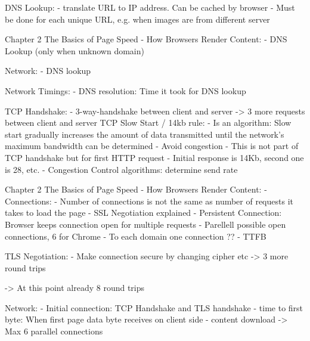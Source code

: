 
DNS Lookup:
- translate URL to IP address. Can be cached by browser
- Must be done for each unique URL, e.g. when images are from different server


Chapter 2 The Basics of Page Speed - How Browsers Render Content:
- DNS Lookup (only when unknown domain)

Network:
- DNS lookup


Network Timings:
- DNS resolution: Time it took for DNS lookup






TCP Handshake:
- 3-way-handshake between client and server
-> 3 more requests between client and server
TCP Slow Start / 14kb rule:
- Is an algorithm: Slow start gradually increases the amount of data transmitted until the network's maximum bandwidth can be determined
- Avoid congestion
- This is not part of TCP handshake but for first HTTP request
- Initial response is 14Kb, second one is 28, etc.
- Congestion Control algorithms: determine send rate

Chapter 2 The Basics of Page Speed - How Browsers Render Content:
- Connections:
- Number of connections is not the same as number of requests it takes to load the page
- SSL Negotiation explained
- Persistent Connection: Browser keeps connection open for multiple requests
- Parellell possible open connections, 6 for Chrome
- To each domain one connection ??
- TTFB





TLS Negotiation:
- Make connection secure by changing cipher etc
-> 3 more round trips

-> At this point already 8 round trips

Network:
- Initial connection: TCP Handshake and TLS handshake
- time to first byte: When first page data byte receives on client side
- content download
-> Max 6 parallel connections



